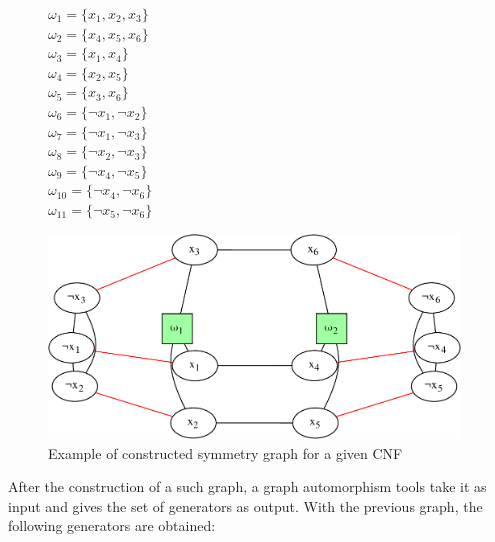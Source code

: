 \begin{figure}[h]
	\begin{minipage}[c]{.2\textwidth}
			$\omega_{1} = \{ x_{1}, x_{2}, x_{3} \}$ \\
	$\omega_{2} = \{ x_{4}, x_{5}, x_{6} \}$ \\
	$\omega_{3} = \{ x_{1}, x_{4} \}$ \\
	$\omega_{4} = \{ x_{2}, x_{5} \}$ \\
	$\omega_{5} = \{ x_{3}, x_{6} \}$ \\
	$\omega_{6} = \{ \neg x_{1}, \neg x_{2} \}$ \\
	$\omega_{7} = \{ \neg x_{1}, \neg x_{3} \}$ \\
	$\omega_{8} = \{ \neg x_{2}, \neg x_{3} \}$ \\
	$\omega_{9} = \{ \neg x_{4}, \neg x_{5} \}$ \\
	$\omega_{10} = \{ \neg x_{4}, \neg x_{6} \}$ \\
	$\omega_{11} = \{ \neg x_{5}, \neg x_{6} \}$ \\
	
	\end{minipage}
	\begin{minipage}[l]{.75\textwidth}
		\includegraphics[width=4.3in]{cnfs/graph_cnf_opt-crop}
	\end{minipage}
	\caption{Example of constructed symmetry graph for a given CNF}
	 \label{fig:graph_opt}
\end{figure}



After the construction of a such graph, a graph automorphism tools take it as input and gives the set of generators as output.
With the previous graph, the following generators are obtained:




